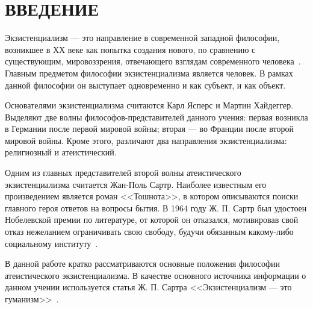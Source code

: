 \section*{ВВЕДЕНИЕ}

Экзистенциализм --- это направление в современной западной философии,
возникшее в ХХ веке как попытка создания нового, по сравнению с существующим,
мировоззрения, отвечающего взглядам современного человека~\cite{solecity_exist}.
Главным предметом философии экзистенциализма является человек.
В рамках данной философии он выступает одновременно и как субъект, и как объект.

Основателями экзистенциализма считаются Карл Ясперс и Мартин Хайдеггер.
Выделяют две волны философов-представителей данного учения:
первая возникла в Германии после первой мировой войны;
вторая --- во Франции после второй мировой войны.
Кроме этого, различают два направления экзистенциализма: религиозный и атеистический.

Одним из главных представителей второй волны атеистического экзистенциализма
считается Жан-Поль Сартр. Наиболее известным его произведением является роман <<Тошнота>>,
в котором описываются поиски главного героя ответов на вопросы бытия.
В 1964 году Ж. П. Сартр был удостоен Нобелевской премии по литературе,
от которой он отказался, мотивировав свой отказ нежеланием ограничивать свою свободу,
будучи обязанным какому-либо социальному институту~\cite{sartr_nobel}.

В данной работе кратко рассматриваются основные положения философии атеистического
экзистенциализма. В качестве основного источника информации о данном учении используется
статья Ж. П. Сартра <<Экзистенциализм --- это гуманизм>>~\cite{sartr_exist_human}.
